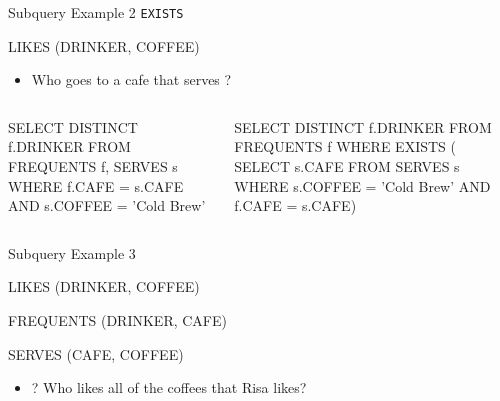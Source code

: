 \documentclass[aspectratio=169]{beamer}
\newenvironment{noindentitemize}
{ \begin{itemize}
 \setlength{\itemsep}{1.5ex}
  \setlength{\parsep}{0pt}   
  \setlength{\parskip}{0pt}
 \addtolength{\leftskip}{-2em}
 }
{ \end{itemize} }
\begin{document}
\begin{frame}[fragile]{Subquery Example 2 \texttt{EXISTS}}

LIKES (DRINKER, COFFEE)

\begin{noindentitemize}
\item Who goes to a cafe that serves \textquotesingle?
\end{noindentitemize}

\begin{columns}[T]
\begin{column}{0.5\textwidth}
\begin{SQL}
SELECT DISTINCT f.DRINKER
FROM FREQUENTS f, SERVES s
WHERE f.CAFE = s.CAFE
	AND s.COFFEE = 'Cold Brew'
\end{SQL}
\end{column}
\begin{column}{0.5\textwidth}
\begin{SQL}
SELECT DISTINCT f.DRINKER
FROM FREQUENTS f
WHERE EXISTS (
	SELECT s.CAFE
	FROM SERVES s
	WHERE s.COFFEE = 'Cold Brew' 
	   AND f.CAFE = s.CAFE)
\end{SQL}
\end{column}
\end{columns}

\end{frame}



\begin{frame}{Subquery Example 3}

LIKES (DRINKER, COFFEE)

FREQUENTS (DRINKER, CAFE)

SERVES (CAFE, COFFEE)


\begin{noindentitemize}
\item[?] Who likes all of the coffees that Risa likes?
\end{noindentitemize}
\end{frame}
\end{document}
